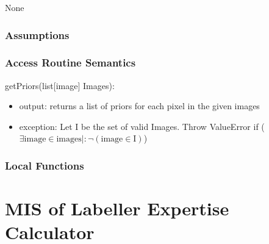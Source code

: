 \documentclass[12pt, titlepage]{article}
\begin{document}
  None
  
  \subsubsection{Assumptions}
  
  
  \subsubsection{Access Routine Semantics}
  
  \noindent getPriors(list[image] Images):
  \begin{itemize}
  \item output: returns a list of priors for each pixel in the given images
  \item exception: Let I be the set of valid Images. Throw ValueError if ($\exists \text{image} \in \text{images} |: \neg (\text{image} \in \text{I})$)\\
  \end{itemize}


  
  
  
  \subsubsection{Local Functions}

   
  

\newpage


\section{MIS of Labeller Expertise Calculator }\label{labeller expertise calculator}
  
\end{document}
